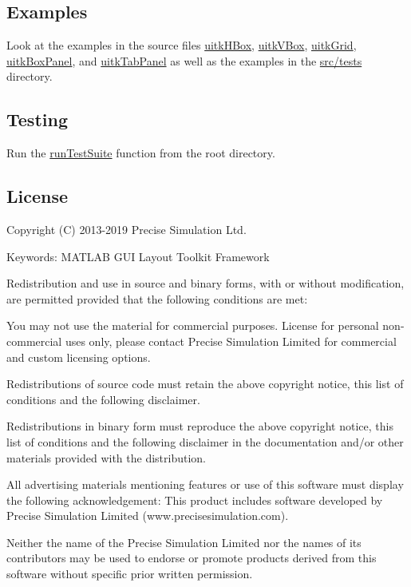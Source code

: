 \subsection*{Examples }

Look at the examples in the source files \hyperlink{uitkHBox_8m}{uitk\+H\+Box}, \hyperlink{uitkVBox_8m}{uitk\+V\+Box}, \hyperlink{uitkGrid_8m}{uitk\+Grid}, \hyperlink{uitkBoxPanel_8m}{uitk\+Box\+Panel}, and \hyperlink{uitkTabPanel_8m}{uitk\+Tab\+Panel} as well as the examples in the \hyperlink{dir_d93a1d4020dea85bb71b237545b5e722}{src/tests} directory.

\subsection*{Testing }

Run the \hyperlink{runTestSuite_8m}{run\+Test\+Suite} function from the root directory.

\subsection*{License }

Copyright (C) 2013-\/2019 Precise Simulation Ltd.

Keywords\+: M\+A\+T\+L\+AB G\+UI Layout Toolkit Framework

Redistribution and use in source and binary forms, with or without modification, are permitted provided that the following conditions are met\+:


\begin{DoxyEnumerate}
\item You may not use the material for commercial purposes. License for personal non-\/commercial uses only, please contact Precise Simulation Limited for commercial and custom licensing options.
\item Redistributions of source code must retain the above copyright notice, this list of conditions and the following disclaimer.
\item Redistributions in binary form must reproduce the above copyright notice, this list of conditions and the following disclaimer in the documentation and/or other materials provided with the distribution.
\item All advertising materials mentioning features or use of this software must display the following acknowledgement\+: This product includes software developed by Precise Simulation Limited (www.\+precisesimulation.\+com).
\item Neither the name of the Precise Simulation Limited nor the names of its contributors may be used to endorse or promote products derived from this software without specific prior written permission.
\end{DoxyEnumerate}

